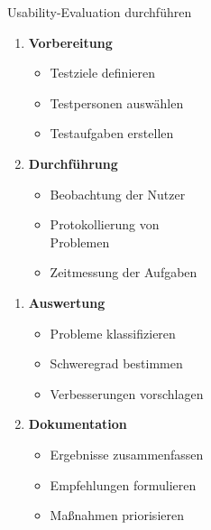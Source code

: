 \begin{KR}{Usability-Evaluation durchführen}
\vspace{-2mm}\\
\begin{minipage}[t]{0.5\linewidth}
\begin{enumerate}[start=1]
    \item \textbf{Vorbereitung}
    \begin{itemize}
        \item Testziele definieren
        \item Testpersonen auswählen
        \item Testaufgaben erstellen
    \end{itemize}
    \item \textbf{Durchführung}
    \begin{itemize}
        \item Beobachtung der Nutzer
        \item Protokollierung von \\Problemen
        \item Zeitmessung der Aufgaben
    \end{itemize}
\end{enumerate}
\end{minipage}
\begin{minipage}[t]{0.5\linewidth}
\begin{enumerate}[start=3]
    \item \textbf{Auswertung}
    \begin{itemize}
        \item Probleme klassifizieren
        \item Schweregrad bestimmen
        \item Verbesserungen vorschlagen
    \end{itemize}
    
    \item \textbf{Dokumentation}
    \begin{itemize}
        \item Ergebnisse zusammenfassen
        \item Empfehlungen formulieren
        \item Maßnahmen priorisieren
    \end{itemize}
\end{enumerate}
\end{minipage}
\end{KR}

